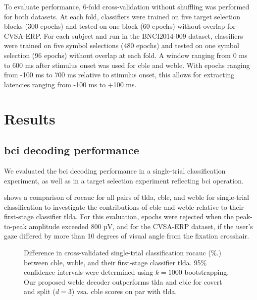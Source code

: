 To evaluate performance, 6-fold cross-validation without shuffling was performed for both
datasets.
At each fold, classifiers were trained on five target selection blocks (300
epochs) and tested on one block (60 epochs) without overlap for CVSA-ERP.
For each subject and run in the BNCI2014-009 dataset, classifiers
were trained on five symbol selections (480 epochs) and tested on one symbol
selection (96 epochs) without overlap at each fold.
A window ranging from 0 ms to 600 ms after stimulus onset was used for \ac{cble} and \ac{wcble}.
With epochs ranging from -100 ms to 700 ms relative to stimulus onset, this
allows for extracting latencies ranging from -100 ms to +100 ms.


\section{Results}

\subsection{\Acs{bci} decoding performance}%
\label{sec:covert-align/results/bloc-acc}

We evaluated the \ac{bci} decoding performance in a single-trial classification
experiment, as well as in a target selection experiment reflecting \ac{bci}
operation.

 shows a comparison of \ac{rocauc}
for all pairs of \ac{tlda}, \ac{cble},
and \ac{wcble} for single-trial classification to investigate the contributions of
\ac{cble} and \ac{wcble} relative to their first-stage classifier \ac{tlda}.
For this evaluation, epochs were rejected when the peak-to-peak amplitude
exceeded 800 µV, and for the CVSA-ERP dataset, if the user's gaze differed by more than
10 degrees of visual angle from the fixation crosshair.
\begin{figure}[t]
  
  \caption[Difference in classification \acs{rocauc}.]{%
    Difference in cross-validated
    single-trial classification \acl{rocauc} (\%.)
    between \ac{cble}, \ac{wcble}, and their first-stage classifier \ac{tlda}.
    95\% confidence intervals were determined using $k=1000$ bootstrapping.
    Our proposed \ac{wcble} decoder outperforms \ac{tlda} and \ac{cble} for covert and split
    ($d=3$)	\ac{vsa}. \ac{cble} scores on par with \ac{tlda}.
    }
		\label{fig:covert-align/single-trial-roc-auc-diff}%
\end{figure}

